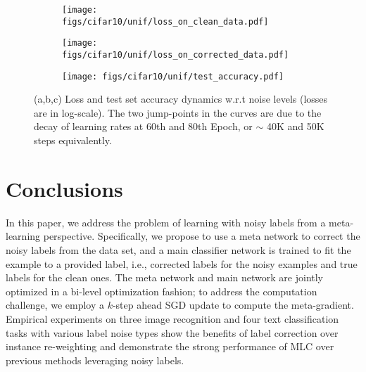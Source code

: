 \begin{figure}[t]\centering
  \begin{subfigure}{0.32\linewidth}
      \centering
    \texttt{[image: figs/cifar10/unif/loss\_on\_clean\_data.pdf]}
    \caption{}
  \end{subfigure}
  \begin{subfigure}{0.32\linewidth}
      \centering
      \texttt{[image: figs/cifar10/unif/loss\_on\_corrected\_data.pdf]}
      \caption{}
    \end{subfigure}
  \begin{subfigure}{0.32\linewidth}
      \centering
      \texttt{[image: figs/cifar10/unif/test\_accuracy.pdf]}
      \caption{}
  \end{subfigure}
  \caption{(a,b,c) Loss and test set accuracy dynamics w.r.t noise levels (losses are
    in log-scale). The two jump-points in the curves are due to the
    decay of learning rates at 60th and 80th Epoch, or $\sim$ 40K and
    50K steps equivalently.}
  \label{fig:loss}
\end{figure}


\section{Conclusions}
\label{sec:conclusion}

In this paper, we address the problem of learning with noisy labels
from a meta-learning perspective. Specifically, we propose to use a
meta network to correct the noisy labels from the data set, and a main
classifier network is trained to fit the example to a provided label,
i.e., corrected labels for the noisy examples and true labels for the
clean ones. The meta network and main network are jointly optimized in
a bi-level optimization fashion; to address the computation challenge,
we employ a $k$-step ahead SGD update to compute the
meta-gradient. Empirical experiments on three image recognition and
four text classification tasks with various label noise types show the
benefits of label correction over instance re-weighting and
demonstrate the strong performance of MLC over previous methods
leveraging noisy labels.


